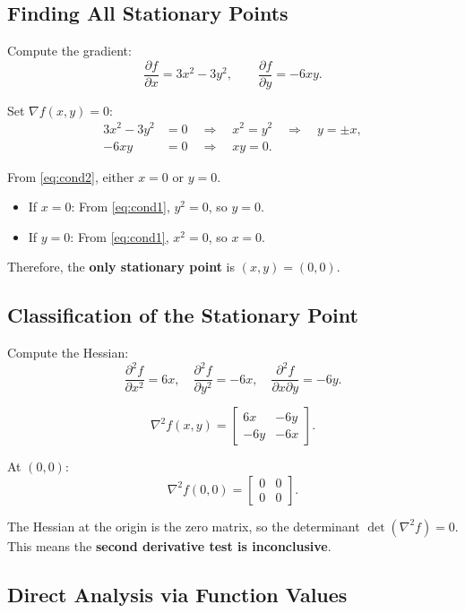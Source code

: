 \documentclass{article}
\begin{document}
\subsection*{Finding All Stationary Points}

Compute the gradient:
\[
\frac{\partial f}{\partial x}=3x^2-3y^2,
\qquad
\frac{\partial f}{\partial y}=-6xy.
\]

Set $\nabla f(x,y)=0$:
\begin{align}
3x^2-3y^2 &= 0 \quad \Rightarrow \quad x^2=y^2 \quad \Rightarrow \quad y=\pm x, \label{eq:cond1}\\
-6xy &= 0 \quad \Rightarrow \quad xy=0. \label{eq:cond2}
\end{align}

From \eqref{eq:cond2}, either $x=0$ or $y=0$.
\begin{itemize}
    \item If $x=0$: From \eqref{eq:cond1}, $y^2=0$, so $y=0$.
    \item If $y=0$: From \eqref{eq:cond1}, $x^2=0$, so $x=0$.
\end{itemize}

Therefore, the \textbf{only stationary point} is $(x,y)=(0,0)$.

\subsection*{Classification of the Stationary Point}

Compute the Hessian:
\[
\frac{\partial^2 f}{\partial x^2}=6x,
\quad
\frac{\partial^2 f}{\partial y^2}=-6x,
\quad
\frac{\partial^2 f}{\partial x\partial y}=-6y.
\]

\[
\nabla^2 f(x,y)=
\begin{bmatrix}
6x & -6y\\
-6y & -6x
\end{bmatrix}.
\]

At $(0,0)$:
\[
\nabla^2 f(0,0)=
\begin{bmatrix}
0 & 0\\
0 & 0
\end{bmatrix}.
\]

The Hessian at the origin is the zero matrix, so the determinant $\det(\nabla^2 f)=0$. This means the \textbf{second derivative test is inconclusive}.

\subsection*{Direct Analysis via Function Values}
\end{document}
